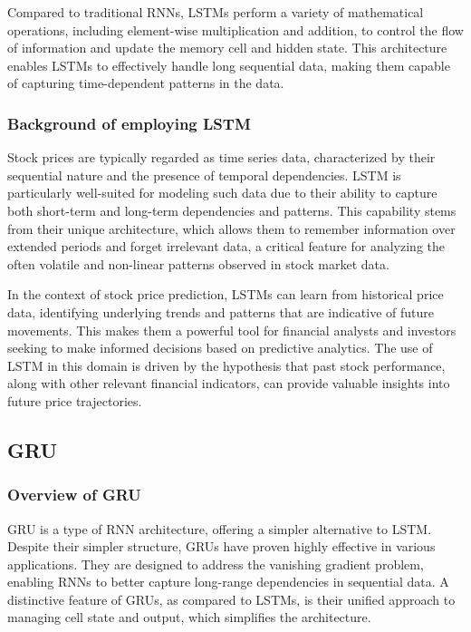 Compared to traditional RNNs, LSTMs perform a variety of mathematical operations, including element-wise multiplication and addition, to control the flow of information and update the memory cell and hidden state. 
This architecture enables LSTMs to effectively handle long sequential data, making them capable of capturing time-dependent patterns in the data.

\subsubsection{Background of employing LSTM}

Stock prices are typically regarded as time series data, characterized by their sequential nature and the presence of temporal dependencies. 
LSTM is particularly well-suited for modeling such data due to their ability to capture both short-term and long-term dependencies and patterns. 
This capability stems from their unique architecture, which allows them to remember information over extended periods and forget irrelevant data, a critical feature for analyzing the often volatile and non-linear patterns observed in stock market data.

In the context of stock price prediction, LSTMs can learn from historical price data, identifying underlying trends and patterns that are indicative of future movements. 
This makes them a powerful tool for financial analysts and investors seeking to make informed decisions based on predictive analytics. The use of LSTM in this domain is driven by the hypothesis that past stock performance, 
along with other relevant financial indicators, can provide valuable insights into future price trajectories.

\subsection{GRU}
\subsubsection{Overview of GRU}

GRU is a type of RNN architecture, offering a simpler alternative to LSTM. 
Despite their simpler structure, GRUs have proven highly effective in various applications. They are designed to address the vanishing gradient problem, enabling RNNs to better capture long-range dependencies in sequential data. 
A distinctive feature of GRUs, as compared to LSTMs, is their unified approach to managing cell state and output, which simplifies the architecture.

